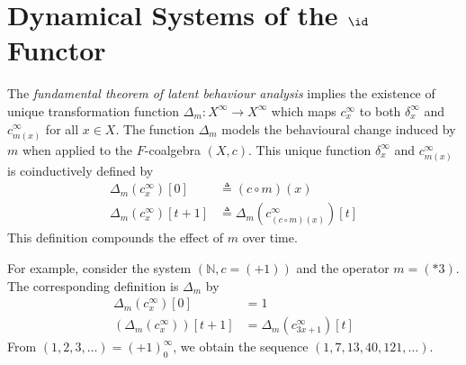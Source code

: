 \section{Dynamical Systems of the $\id$ Functor}



The \emph{fundamental theorem of latent behaviour analysis} implies the existence of unique transformation function $\Delta_m\colon X^\infty\rightarrow X^\infty$ which maps $c_{x}^\infty$ to both $\delta_{x}^\infty$ and $c_{m(x)}^\infty$ for all $x\in X$. The function $\Delta_m$ models the behavioural change induced by $m$ when applied to the $F$-coalgebra $(X,c)$. This unique function $\delta_{x}^\infty$ and $c_{m(x)}^\infty$ is 
coinductively defined by 
\begin{align*}
    \Delta_{m}(c^\infty_x)[0]&\triangleq (c \circ m)(x)\\
    \Delta_{m}(c^\infty_x)[t+1]&\triangleq \Delta_{m}\left(c^\infty_{(c\circ m)(x)}\right)[t]
\end{align*}
This definition compounds the effect of $m$ over time.

For example, consider the system $(\mathbb{N},c=(+1))$ and the operator $m=(*3)$. The corresponding definition is $\Delta_{m}$ by
\begin{align*}
    \Delta_{m}(c^\infty_x)[0]&=1\\%
    (\Delta_{m}(c^\infty_x))[t+1]&=\Delta_{m}(c^\infty_{3x+1})[t]
\end{align*}
From $(1,2,3,\ldots)=(+1)^\infty_0$, we obtain the sequence $(1,7,13,40,121,\ldots)$. 

